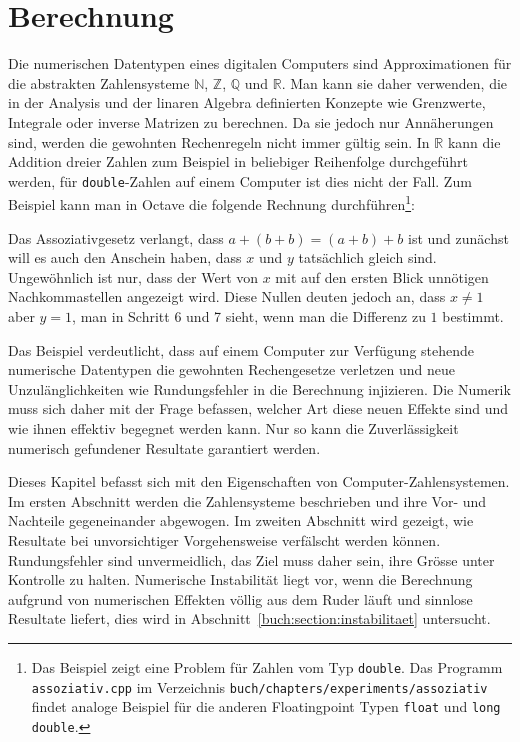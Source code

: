 %
%
%
\chapter{Berechnung
\label{chapter:berechnung}}
\rhead{}
Die numerischen Datentypen eines digitalen Computers sind Approximationen
für die abstrakten Zahlensysteme $\mathbb{N}$, $\mathbb{Z}$, $\mathbb{Q}$
und $\mathbb{R}$.
Man kann sie daher verwenden, die in der Analysis und der linaren Algebra
definierten Konzepte wie Grenzwerte, Integrale oder inverse Matrizen zu
berechnen.
Da sie jedoch nur Annäherungen sind, werden die gewohnten Rechenregeln 
nicht immer gültig sein.
In $\mathbb{R}$ kann die Addition dreier Zahlen zum Beispiel in beliebiger
Reihenfolge durchgeführt werden, für \texttt{double}-Zahlen auf einem
Computer ist dies nicht der Fall.
Zum Beispiel kann man in Octave die folgende Rechnung durchführen\footnote{%
Das Beispiel zeigt eine Problem für Zahlen vom Typ \texttt{double}.
Das Programm \texttt{assoziativ.cpp} im Verzeichnis
\texttt{buch/chapters/experiments/assoziativ} findet analoge Beispiel für
die anderen Floatingpoint Typen \texttt{float} und \texttt{long double}.}:

Das Assoziativgesetz verlangt, dass $a+(b+b)=(a+b)+b$ ist und zunächst
will es auch den Anschein haben, dass $x$ und $y$ tatsächlich gleich sind.
Ungewöhnlich ist nur, dass der Wert von $x$ mit auf den ersten Blick
unnötigen Nachkommastellen angezeigt wird.
Diese Nullen deuten jedoch an, dass $x\ne 1$ aber $y=1$, man in Schritt
6 und 7 sieht, wenn man die Differenz zu $1$ bestimmt.

Das Beispiel verdeutlicht, dass auf einem Computer zur Verfügung
stehende numerische Datentypen die gewohnten Rechengesetze verletzen und
neue Unzulänglichkeiten wie Rundungsfehler in die Berechnung injizieren.
Die Numerik muss sich daher mit der Frage befassen, welcher Art diese
neuen Effekte sind und wie ihnen effektiv begegnet werden kann.
Nur so kann die Zuverlässigkeit numerisch gefundener Resultate
garantiert werden.

Dieses Kapitel befasst sich mit den Eigenschaften von Computer-Zahlensystemen.
Im ersten Abschnitt werden die Zahlensysteme beschrieben und ihre 
Vor- und Nachteile gegeneinander abgewogen.
Im zweiten Abschnitt wird gezeigt, wie Resultate bei unvorsichtiger
Vorgehensweise verfälscht werden können.
Rundungsfehler sind unvermeidlich, das Ziel muss daher sein, ihre
Grösse unter Kontrolle zu halten.
Numerische Instabilität liegt vor, wenn die Berechnung aufgrund von
numerischen Effekten völlig aus dem Ruder läuft und sinnlose Resultate
liefert, dies wird in Abschnitt~\ref{buch:section:instabilitaet}
untersucht.















